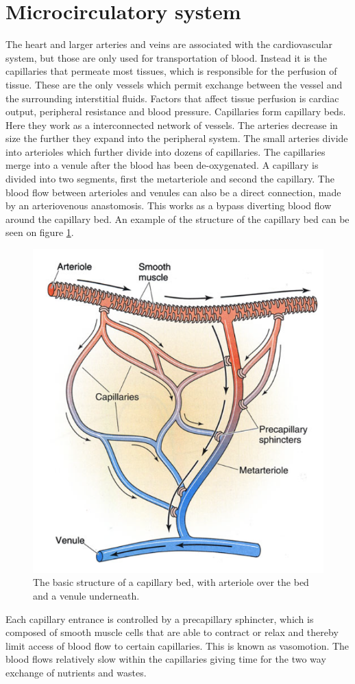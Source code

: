 
\section{Microcirculatory system}

The heart and larger arteries and veins are associated with the cardiovascular system, but those are only used for transportation of blood. Instead it is the capillaries that permeate most tissues, which is responsible for the perfusion of tissue. These are the only vessels which permit exchange between the vessel and the surrounding interstitial fluids. Factors that affect tissue perfusion is cardiac output, peripheral resistance and blood pressure. Capillaries form capillary beds. Here they work as a interconnected network of vessels.
The arteries decrease in size the further they expand into the peripheral system. The small arteries divide into arterioles which further divide into dozens of capillaries. The capillaries merge into a venule after the blood has been de-oxygenated. A capillary is divided into two segments, first the metarteriole and second the capillary. The blood flow between arterioles and venules can also be a direct connection, made by an arteriovenous anastomosis. This works as a bypass diverting blood flow around the capillary bed. An example of the structure of the capillary bed can be seen on figure \ref{fig:beds}.\cite{martini2012}
\begin{figure}[H]                                         
	\includegraphics[width=.4\textwidth]{figures/capillary_bed}  
	\caption{The basic structure of a capillary bed, with arteriole over the bed and a venule underneath.\cite{martini2012}}
	\label{fig:beds}  
\end{figure}          

Each capillary entrance is controlled by a precapillary sphincter, which is composed of smooth muscle cells that are able to contract or relax and thereby limit access of blood flow to certain capillaries. This is known as vasomotion. The blood flows relatively slow within the capillaries giving time for the two way exchange of nutrients and wastes.\cite{martini2012}

